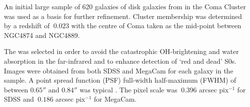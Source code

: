 An initial large sample of 620 galaxies of disk galaxies from \citet{head_dissecting_2014} in the Coma Cluster was used as a basis for further refinement. Cluster membership was determined by a redshift of $~0.023$ with the centre of Coma taken as the mid-point between NGC4874 and NGC4889.

The \iband was selected in order to avoid the catastrophic OH-brightening and water absorption in the far-infrared and to enhance detection of `red and dead' S0s. Images were obtained from both SDSS and MegaCam for each galaxy in the sample. A point spread function (PSF) full-width half-maximum (FWHM) of between $0.65''$ and $0.84''$ was typical \citep{head_dissecting_2014}. The pixel scale was $~0.396$ arcsec pix$^{-1}$ for SDSS and $~0.186$ arcsec pix$^{-1}$ for MegaCam. 
